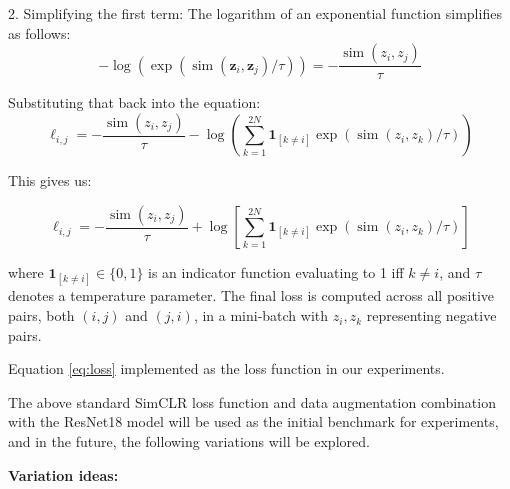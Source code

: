 2. Simplifying the first term: The logarithm of an exponential function simplifies as follows:
\[
-\log\left(\exp\left(\operatorname{sim}\left(\boldsymbol{z}_i, \boldsymbol{z}_j\right) / \tau\right)\right) = -\frac{\operatorname{sim}\left(z_{i}, z_{j}\right)}{\tau}
\]

Substituting that back into the equation:
\[
\ell_{i, j} = -\frac{\operatorname{sim}\left(z_{i}, z_{j}\right)}{\tau} - \log\left(\sum_{k=1}^{2 N} \mathbf{1}_{[k \neq i]} \exp\left(\operatorname{sim}\left(z_{i}, z_{k}\right) / \tau\right)\right)
\]

This gives us:

\begin{equation}
\ell_{i, j} = -\frac{\operatorname{sim}\left(z_{i}, z_{j}\right)}{\tau} + \log\left[\sum_{k=1}^{2 N} \mathbf{1}_{[k \neq i]} \exp\left(\operatorname{sim}\left(z_{i}, z_{k}\right) / \tau\right)\right]
\label{eq:loss}
\end{equation}

where \(\mathbf{1}_{[k \neq i]} \in \{0, 1\}\) is an indicator function evaluating to 1 iff \(k \neq i\), and \(\tau\) denotes a temperature parameter. The final loss is computed across all positive pairs, both \((i, j)\) and \((j, i)\), in a mini-batch with $z_i, z_k$ representing negative pairs.

Equation \ref{eq:loss} implemented as the loss function in our experiments.

The above standard SimCLR loss function and data augmentation combination  with the ResNet18 model will be used as the initial benchmark for experiments, and in the future, the following variations will be explored.

\textbf{Variation ideas:}


